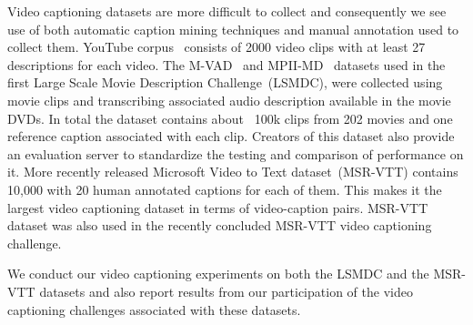 Video captioning datasets are more difficult to collect and consequently we see 
use of both automatic caption mining techniques and manual annotation used to
collect them.
YouTube corpus~\cite{chen2011collecting} consists of 2000 video clips with
at least 27 descriptions for each video.
The M-VAD~\cite{rohrbach15cvpr} and MPII-MD~\cite{AtorabiM-VAD2015}
datasets used in the first Large Scale Movie Description Challenge~(LSMDC), were
collected using movie clips and transcribing associated audio
description available in the movie DVDs.
In total the dataset contains about ~100k clips from 202 movies and one
reference caption associated with each clip. 
Creators of this dataset also provide an evaluation server to standardize the
testing and comparison of performance on it.
More recently released Microsoft Video to Text dataset~(MSR-VTT) contains 10,000
with 20 human annotated captions for each of them. 
This makes it the largest video captioning dataset in terms of video-caption
pairs.
MSR-VTT dataset was also used in the recently concluded MSR-VTT video captioning
challenge.

We conduct our video captioning experiments on both the LSMDC and the MSR-VTT
datasets and also report results from our participation of the video captioning
challenges associated with these datasets. 

